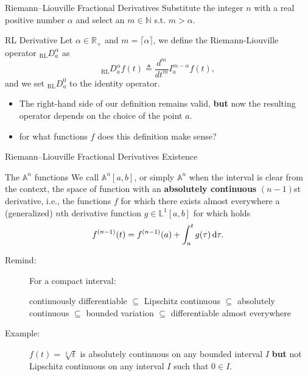 \documentclass[aspectratio=169,xcolor=dvipsnames]{beamer}
\begin{document}
\begin{frame}{Riemann--Liouville Fractional Derivatives}
Substitute the integer $n$ with a real positive number $\alpha$ and select an $m \in \mathbb{N}$ s.t. $m > \alpha$.

\begin{block}{RL Derivative}
Let $\alpha \in \mathbb{R}_+$ and $m = \lceil \alpha \rceil$, we define the Riemann-Liouville operator ${}_\text{RL}D_a^\alpha$ as
\[
{}_\text{RL}D_a^\alpha f(t) \triangleq \frac{d^m}{d t^m} I_a^{m-\alpha} f(t),
\]
and we set ${}_\text{RL}D_a^0$ to the identity operator.
\end{block}

\begin{itemize}
	\item[{\textcolor{danger}{\faExclamationTriangle}}] The right-hand side of our definition remains valid, \alert{\textbf{but}} now the resulting operator \alert{depends on the choice of the point $a$}.
	\item<2>[{\faQuestionCircle}] for what functions $f$ does this definition make sense?
\end{itemize}

\end{frame}

\begin{frame}{Riemann--Liouville Fractional Derivatives Existence}

\begin{block}{The $\mathbb{A}^n$ functions}
We call $\mathbb{A}^n[a,b]$, or simply $\mathbb{A}^n$ when the interval is
clear from the context, the space of function with an \textbf{absolutely continuous}
$(n-1)$st derivative, i.e., the functions $f$ for which there exists almost
everywhere a (generalized) $n$th derivative function $g \in \mathbb{L}^1[a,b]$ for which holds
\[
f^{(n-1)}(t) = f^{(n-1)}(a) + \int_{a}^{t} g(\tau)\,{\rm d}\tau.
\]
\end{block}

\begin{description}
	\item[Remind:] For a compact interval:
	\begin{center}
		    continuously differentiable $\subseteq$ Lipschitz continuous $\subseteq$ absolutely continuous $\subseteq$ bounded variation $\subseteq$ differentiable almost everywhere
	\end{center}
	\item[Example:] $f(t) = \sqrt[3]{t}$ is absolutely continuous on any bounded interval $I$ \textbf{but} not Lipschitz continuous on any interval $I$ such that $0 \in I$.
\end{description}

\end{frame}
\end{document}
